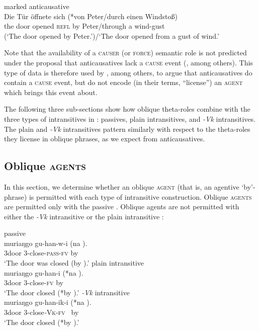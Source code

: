 \documentclass[output=paper]{langsci/lanmgscibook}
\begin{document}
\ex\label{ex:gluckman:6c}
{{marked anticausative}}\\
\gll   Die Tür   öffnete sich (*von Peter/durch einen Windstoß)\\
       the door opened \textsc{refl}  by   Peter/through a wind-gust\\
\glt (‘The door opened by Peter.’)/‘The door opened from a gust of wind.’
\z
\z

Note that the availability of a \textsc{causer} (or \textsc{force}) semantic role is not predicted under the proposal that anticausatives lack a\textsc{ cause} event (\citealt{Haspelmath1993}, among others). This type of data is therefore used by \citet{Schäfer2008}, among others, to argue that anticausatives do contain a \textsc{cause} event, but do not encode (in their terms, “license”) an \textsc{agent} which brings this event about. 

The following three sub-sections show how oblique theta-roles combine with the three types of intransitives in : passives, plain intransitives, and \textit{-Vk} intransitives. The plain and \textit{-Vk} intransitives pattern similarly with respect to the theta-roles they license in oblique phrases, as we expect from anticausatives.

\subsection{Oblique \textsc{agents}} 

In this section, we determine whether an oblique \textsc{agent} (that is, an agentive ‘by’-phrase) is permitted with each type of  intransitive construction. Oblique \textsc{agents} are permitted only with the  passive . Oblique agents are not permitted with either the \textit{-Vk} intransitive  or the plain intransitive :

\ea\label{ex:gluckman:7} 
  \ea\label{ex:gluckman:7a} 
  {{passive}}\\
  \gll muriaŋgo gu-han-w-i            (na ).\\
      3door       3-close-\textsc{pass}-\textsc{fv}    by  \\
  \glt ‘The door was closed (by ).’
  \ex\label{ex:gluckman:7b} 
  {{ plain intransitive}}\\
  \gll muriaŋgo gu-han-i   (*na ).\\
      3door      3-close-\textsc{fv}   by   \\
  \glt ‘The door closed (*by ).’
  \ex\label{ex:gluckman:7c} 
  {{\textit{-Vk}}{ intransitive}}\\
  \gll muriaŋgo gu-han-ik-i     (*na ).\\
      3door       3-close\textit{-}\textsc{Vk}-\textsc{fv}~ by  \\
  \glt     ‘The door closed (*by ).’\\
  \z
\z
     
\end{document}
